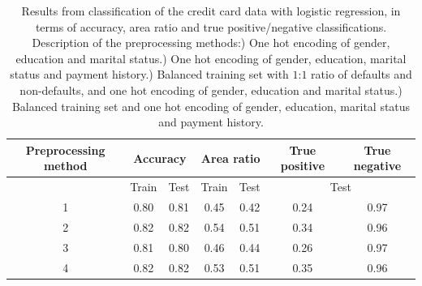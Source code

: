 \begin{table}[!h]
\label{tab:logreg_allresults}
\caption{Results from classification of the credit card data with logistic regression, in terms of accuracy, area ratio and true positive/negative classifications. Description of the preprocessing methods:) One hot encoding of gender, education and marital status.) One hot encoding of gender, education, marital status and payment history.) Balanced training set with $1$:$1$ ratio of defaults and non-defaults, and one hot encoding of gender, education and marital status.) Balanced training set and one hot encoding of gender, education, marital status and payment history.}
\begin{tabular}{|c|c|c|c|c|c|c|}
\hline
Preprocessing method & \multicolumn{2}{c|}{Accuracy} & \multicolumn{2}{c|}{Area ratio} & True positive & True negative \\ \hline
                     & Train          & Test         & Train           & Test          & \multicolumn{2}{c|}{Test}     \\ \hline
1                    & 0.80           & 0.81         & 0.45            & 0.42          & 0.24          & 0.97          \\ \hline
2                    & 0.82           & 0.82         & 0.54            & 0.51          & 0.34          & 0.96          \\ \hline
3                    & 0.81           & 0.80         & 0.46            & 0.44          & 0.26          & 0.97          \\ \hline
4                    & 0.82           & 0.82         & 0.53            & 0.51          & 0.35          & 0.96          \\ \hline
\end{tabular}
\end{table}

